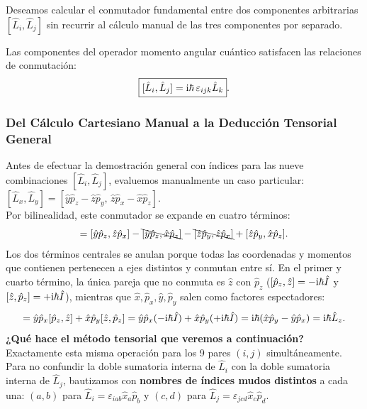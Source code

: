 Deseamos calcular el conmutador fundamental entre dos componentes arbitrarias $[\hat{L}_i, \hat{L}_j]$ sin recurrir al cálculo manual de las tres componentes por separado.

\begin{teoremabox}
    Las componentes del operador momento angular cuántico satisfacen las relaciones de conmutación:
    \begin{equation}
        \boxed{[\hat{L}_i, \hat{L}_j] = \mathrm{i}\hbar\,\varepsilon_{ijk}\hat{L}_k}.
        \label{eq:so3_algebra}
    \end{equation}
\end{teoremabox}

\subsubsection{Del Cálculo Cartesiano Manual a la Deducción Tensorial General}

\begin{alertabox}
    Antes de efectuar la demostración general con índices para las nueve combinaciones $[\hat{L}_i, \hat{L}_j]$, evaluemos manualmente un caso particular: $[\hat{L}_x, \hat{L}_y] = [\hat{y}\hat{p}_z - \hat{z}\hat{p}_y, \, \hat{z}\hat{p}_x - \hat{x}\hat{p}_z]$.\\
    Por bilinealidad, este conmutador se expande en cuatro términos:
    \begin{equation}
        [\hat{L}_x, \hat{L}_y] = [\hat{y}\hat{p}_z, \hat{z}\hat{p}_x] - \bcancel{[\hat{y}\hat{p}_z, \hat{x}\hat{p}_z]} - \bcancel{[\hat{z}\hat{p}_y, \hat{z}\hat{p}_x]} + [\hat{z}\hat{p}_y, \hat{x}\hat{p}_z].
    \end{equation}
    Los dos términos centrales se anulan porque todas las coordenadas y momentos que contienen pertenecen a ejes distintos y conmutan entre sí. En el primer y cuarto término, la única pareja que no conmuta es $\hat{z}$ con $\hat{p}_z$ ($[\hat{p}_z, \hat{z}] = -\mathrm{i}\hbar\hat{I}$ y $[\hat{z}, \hat{p}_z] = +\mathrm{i}\hbar\hat{I}$), mientras que $\hat{x}, \hat{p}_x, \hat{y}, \hat{p}_y$ salen como factores espectadores:
    \begin{equation}
        [\hat{L}_x, \hat{L}_y] = \hat{y}\hat{p}_x [\hat{p}_z, \hat{z}] + \hat{x}\hat{p}_y [\hat{z}, \hat{p}_z] = \hat{y}\hat{p}_x(-\iu\hbar\hat{I}) + \hat{x}\hat{p}_y(+\iu\hbar\hat{I}) = \iu\hbar(\hat{x}\hat{p}_y - \hat{y}\hat{p}_x) = \iu\hbar\hat{L}_z.
    \end{equation}
    \textbf{¿Qué hace el método tensorial que veremos a continuación?} Exactamente esta misma operación para los 9 pares $(i, j)$ simultáneamente. Para no confundir la doble sumatoria interna de $\hat{L}_i$ con la doble sumatoria interna de $\hat{L}_j$, bautizamos con \textbf{nombres de índices mudos distintos} a cada una: $(a, b)$ para $\hat{L}_i = \varepsilon_{iab}\hat{x}_a\hat{p}_b$ y $(c, d)$ para $\hat{L}_j = \varepsilon_{jcd}\hat{x}_c\hat{p}_d$.
\end{alertabox}

